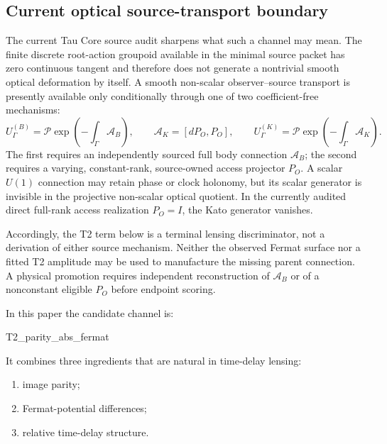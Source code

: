 \documentclass[11pt]{article}
\newenvironment{Shaded}{}{}
\newcommand{\NormalTok}[1]{#1}
\providecommand{\tightlist}{%
  \setlength{\itemsep}{0pt}\setlength{\parskip}{0pt}}
\begin{document}
\subsection{Current optical source-transport boundary}

The current Tau Core source audit sharpens what such a channel may mean.
The finite discrete root-action groupoid available in the minimal source
packet has zero continuous tangent and therefore does not generate a
nontrivial smooth optical deformation by itself. A smooth non-scalar
observer--source transport is presently available only conditionally through
one of two coefficient-free mechanisms:
\[
U_{\Gamma}^{(B)}=
\mathcal{P}\exp\!\left(-\int_{\Gamma}\mathcal{A}_{B}\right),
\qquad
\mathcal{A}_{K}=[dP_O,P_O],
\qquad
U_{\Gamma}^{(K)}=
\mathcal{P}\exp\!\left(-\int_{\Gamma}\mathcal{A}_{K}\right).
\]
The first requires an independently sourced full body connection
\(\mathcal A_B\); the second requires a varying, constant-rank,
source-owned access projector \(P_O\). A scalar \(U(1)\) connection may
retain phase or clock holonomy, but its scalar generator is invisible in the
projective non-scalar optical quotient. In the currently audited direct
full-rank access realization \(P_O=I\), the Kato generator vanishes.

Accordingly, the T2 term below is a terminal lensing discriminator, not a
derivation of either source mechanism. Neither the observed Fermat surface
nor a fitted T2 amplitude may be used to manufacture the missing parent
connection. A physical promotion requires independent reconstruction of
\(\mathcal A_B\) or of a nonconstant eligible \(P_O\) before endpoint scoring.

In this paper the candidate channel is:

\begin{Shaded}
\begin{Highlighting}[]
\NormalTok{T2\_parity\_abs\_fermat}
\end{Highlighting}
\end{Shaded}

It combines three ingredients that are natural in time-delay lensing:

\begin{enumerate}
\def\labelenumi{\arabic{enumi}.}
\tightlist
\item
  image parity;
\item
  Fermat-potential differences;
\item
  relative time-delay structure.
\end{enumerate}
\end{document}
